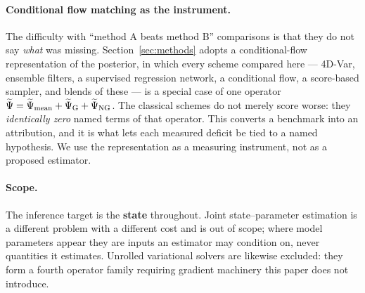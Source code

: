 \paragraph{Conditional flow matching as the instrument.}
The difficulty with ``method A beats method B'' comparisons is that they do not
say \emph{what} was missing. Section~\ref{sec:methods} adopts a conditional-flow
representation of the posterior, in which every scheme compared here --- 4D-Var,
ensemble filters, a supervised regression network, a conditional flow, a
score-based sampler, and blends of these --- is a special case of one operator
$\widetilde{\Psi} = \widetilde{\Psi}_{\mathrm{mean}} + \widetilde{\Psi}_{\mathrm{G}} + \widetilde{\Psi}_{\mathrm{NG}}$. The classical schemes do not merely score
worse: they \emph{identically zero} named terms of that operator. This converts a
benchmark into an attribution, and it is what lets each measured deficit be tied
to a named hypothesis. We use the representation as a measuring instrument, not
as a proposed estimator.

\paragraph{Scope.}
The inference target is the \textbf{state} throughout. Joint state--parameter
estimation is a different problem with a different cost and is out of scope;
where model parameters appear they are inputs an estimator may condition on,
never quantities it estimates. Unrolled variational solvers are likewise
excluded: they form a fourth operator family requiring gradient machinery this
paper does not introduce.

